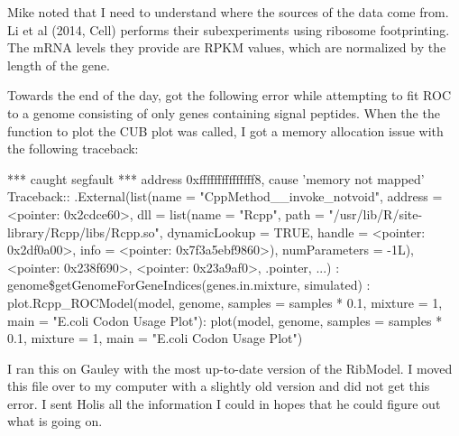 \documentclass[11pt]{labbook}
\begin{document}
Mike noted that I need to understand where the sources of the data come from. Li et al (2014, Cell) performs their subexperiments using ribosome footprinting. The mRNA levels they provide are RPKM values, which are normalized by the length of the gene. 


Towards the end of the day, got the following error while attempting to fit ROC to a genome consisting of only genes containing signal peptides. When the the function to plot the CUB plot was called, I got a memory allocation issue with the following traceback:

*** caught segfault ***
address 0xfffffffffffffff8, cause 'memory not mapped'
\newline
Traceback:: .External(list(name = "CppMethod\_\_invoke\_notvoid", address = <pointer: 0x2cdce60>,     dll = list(name = "Rcpp", path = "/usr/lib/R/site-library/Rcpp/libs/Rcpp.so",         dynamicLookup = TRUE, handle = <pointer: 0x2df0a00>,         info = <pointer: 0x7f3a5ebf9860>), numParameters = -1L),     <pointer: 0x238f690>, <pointer: 0x23a9af0>, .pointer, ...)
: genome\$getGenomeForGeneIndices(genes.in.mixture, simulated)
: plot.Rcpp\_ROCModel(model, genome, samples = samples * 0.1, mixture = 1,     main = "E.coli Codon Usage Plot"): plot(model, genome, samples = samples * 0.1, mixture = 1, main = "E.coli Codon Usage Plot")
 \newline
 
I ran this on Gauley with the most up-to-date version of the RibModel. I moved this file over to my computer with a slightly old version and did not get this error. I sent Holis all the information I could in hopes that he could figure out what is going on.
\end{document}
